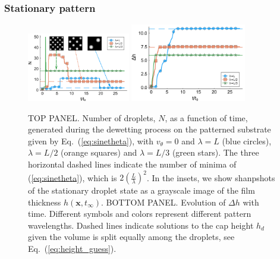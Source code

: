 \documentclass[twocolumn,amsmath,amssymb,showpacs,pre,nofootinbib,superscriptaddress]{revtex4-1} %
\begin{document}
\subsubsection{Stationary pattern}\label{subsec:no_vtheta}
\begin{figure}
    \centering
    \includegraphics[width=0.4\textwidth]{Figures/Clusters_novel_sine_picutres.png}
    \includegraphics[width=0.45\textwidth]{Figures/delta_h_v0_sin_with_dash.pdf}
    \caption{TOP PANEL. Number of droplets, $N$, as a function of time, generated during the dewetting process on the patterned substrate
      given by Eq.~(\ref{eq:sinetheta}), with $v_{\theta}=0$ and $\lambda=L$ (blue circles), $\lambda=L/2$ (orange squares) and
      $\lambda=L/3$ (green stars). The three horizontal dashed lines indicate the number of minima of (\ref{eq:sinetheta}),
      which is $2\left(\frac{L}{\lambda}\right)^2$. In the insets, we show shanpshots of the stationary droplet state as a grayscale image
      of the film thickness $h(\mathbf{x},t_{\infty})$.
      BOTTOM PANEL. Evolution of $\Delta h$ with time.
      Different symbols and colors represent different pattern wavelengths.
      Dashed lines indicate solutions to the cap height $h_d$ given the volume is split equally among the droplets,
      see Eq.~(\ref{eq:height_guess}).}
    \label{fig:clusters_v0_sine}
\end{figure}
\end{document}
